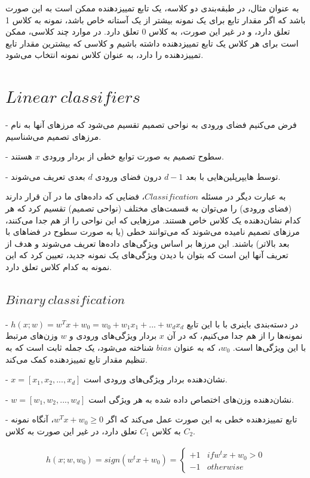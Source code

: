 \documentclass[12pt]{article}
\begin{document}
به عنوان مثال، در طبقه‌بندی دو کلاسه، یک تابع تمییزدهنده ممکن است به این صورت باشد که اگر مقدار تابع برای یک نمونه بیشتر از یک آستانه خاص باشد، نمونه به کلاس 1 تعلق دارد، و در غیر این صورت، به کلاس 0 تعلق دارد. در موارد چند کلاسی، ممکن است برای هر کلاس یک تابع تمییزدهنده داشته باشیم و کلاسی که بیشترین مقدار تابع تمییزدهنده را دارد، به عنوان کلاس نمونه انتخاب می‌شود.

\section{$Linear\:classifiers$}

- فرض می‌کنیم فضای ورودی به نواحی تصمیم تقسیم می‌شود که مرزهای آنها به نام مرزهای تصمیم می‌شناسیم.

- سطوح تصمیم به صورت توابع خطی از بردار ورودی \(x\) هستند.

- توسط هایپرپلین‌هایی با بعد \(d-1\) درون فضای ورودی \(d\) بعدی تعریف می‌شوند.

به عبارت دیگر در مسئله $Classification$، فضایی که داده‌های ما در آن قرار دارند (فضای ورودی) را می‌توان به قسمت‌های مختلف (نواحی تصمیم) تقسیم کرد که هر کدام نشان‌دهنده یک کلاس خاص هستند. مرزهایی که این نواحی را از هم جدا می‌کنند، مرزهای تصمیم نامیده می‌شوند که می‌توانند خطی (یا به صورت سطوح در فضاهای با بعد بالاتر) باشند. این مرزها بر اساس ویژگی‌های داده‌ها تعریف می‌شوند و هدف از تعریف آنها این است که بتوان با دیدن ویژگی‌های یک نمونه جدید، تعیین کرد که این نمونه به کدام کلاس تعلق دارد.\subsection{
$Binary\:classification$ }
- \(h(x; w) = w^Tx + w_0 = w_0 + w_1x_1 + ... + w_dx_d\) 
در دسته‌بندی باینری با با این تابع نمونه‌ها را از هم جدا می‌کنیم، که در آن \(x\) بردار ویژگی‌های ورودی و \(w\) وزن‌های مرتبط با این ویژگی‌ها است. \(w_0\)، که به عنوان $bias$ شناخته می‌شود، یک جمله ثابت است که به تنظیم مقدار تابع تمییزدهنده کمک می‌کند.

- \(x = [x_1, x_2, ..., x_d]\) نشان‌دهنده بردار ویژگی‌های ورودی است.

- \(w = [w_1, w_2, ..., w_d]\) نشان‌دهنده وزن‌های اختصاص داده شده به هر ویژگی است.

- تابع تمییزدهنده خطی به این صورت عمل می‌کند که اگر \(w^Tx + w_0 \geq 0\)، آنگاه نمونه به کلاس \(C_1\) تعلق دارد، در غیر این صورت به کلاس \(C_2\).

\begin{align*}
h(x; w, w_0) = sign(w^t x + w_0) =
\begin{cases}
+1 & if  w^t x + w_0 > 0 \\
-1 & otherwise
\end{cases}
\end{align*}
\end{document}
